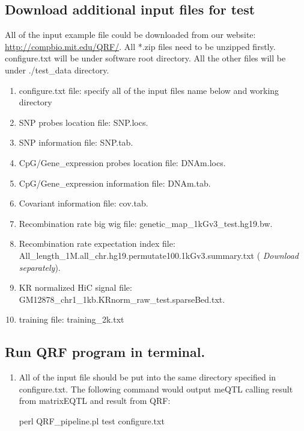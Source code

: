 \documentclass[12pt]{article}
\begin{document}
{\color{blue}\subsection{Download additional input files for test}}
All of the input example file could be downloaded from our website: \url{http://compbio.mit.edu/QRF/}.  All *.zip files need to be unzipped firstly. configure.txt will be under software root directory. All the other files will be under ./test\_data directory.
\begin{enumerate}

\item configure.txt file: specify all of the input files name below and working directory 
\item SNP probes location file: SNP.locs. 
\item SNP information file: SNP.tab. 
\item CpG/Gene\_expression probes location file: DNAm.locs. 
\item CpG/Gene\_expression  information file: DNAm.tab. 
\item Covariant information file: cov.tab. 
\item Recombination rate big wig file: genetic\_map\_1kGv3\_test.hg19.bw. 
\item Recombination rate expectation index file: All\_length\_1M.all\_chr.hg19.permutate100.1kGv3.summary.txt (\emph{\color{red} Download separately}). 
\item KR normalized HiC signal file: GM12878\_chr1\_1kb.KRnorm\_raw\_test.sparseBed.txt. 
\item training file: training\_2k.txt 

\end{enumerate}

{\color{blue}\subsection{Run QRF program in terminal.}}

\begin{enumerate}
\item All of the input file should be put into the same directory specified in configure.txt. The following command would output meQTL calling result from matrixEQTL and result from QRF:
\begin{verbatimtab}
perl QRF_pipeline.pl test configure.txt
\end{verbatimtab}
\end{enumerate}
\end{document}
